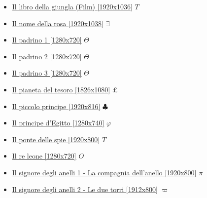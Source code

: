 \begin{itemize}
			\item \href{https://mega.nz/#!RuQB3CpS!5kZ5MSoNps3QmKyJsEtzw25B689mNXPvtUY9MZMNHm8} {Il libro della giungla (Film) [1920x1036]}  $T$ \\ 
			\item \href{https://mega.nz/#!3uo31ADa!0y20l86kdByWKWgxiPvcmo_guPjbonrHq1_gcAfVhRU} {Il nome della rosa [1920x1038]}  $\exists$ \\ 
			\item \href{https://mega.nz/#!pTxAHLZL!-ZDUNL0ARq3fFgcplNjTQq-DqcQzXB6cDNlNs5_CTBI} {Il padrino 1 [1280x720]}  $\varTheta$ \\ 
			\item \href{https://mega.nz/#!wKh2mTSJ!s9XGnMxGqQJEPzmXdtUyudJTwIcn6Z7ObsArBbp_cIo} {Il padrino 2 [1280x720]}  $\varTheta$ \\ 
			\item \href{https://mega.nz/#!JHJGHahS!eXKg582FrnYXIRKzDwEI4YbO5LyMabTIWMwTrmOmXj8} {Il padrino 3 [1280x720]}  $\varTheta$ \\ 
			\item \href{https://mega.nz/#!Ki5zjYjD!UeanMa-b4Y_xc0rEBBdvSq8E0xAIbZ4FoF63f6Bmt8s} {Il pianeta del tesoro [1826x1080]}  $\pounds$ \\ 
			\item \href{https://mega.nz/#!njhUGDbK!TNE4g3WiCOitU9nhAMR3Eb_cT7RNsurPFWLSYiF79GQ} {Il piccolo principe [1920x816]}  $\clubsuit$ \\  
			\item \href{https://mega.nz/#!FDJSACQI!9iSR6UFDTNTuW7K6kRvzIOp-HxEBAnAtjxjPoc-M1Pk} {Il principe d'Egitto [1280x740]}  $\varphi$ \\  
			\item \href{https://mega.nz/#!FvBzFLiI!xc6rxwZbl9knc2yOMdA5J7zRbyU7ebrKpukBRm6ej18} {Il ponte delle spie [1920x800]}  $T$ \\ 
			\item \href{https://mega.nz/#!omwShQBA!GooSXNv3sVK3h-i7CI3tkMjaSiz_UYp65RnRjdimgu8} {Il re leone [1280x720]}  $O$ \\ 
			\item \href{https://mega.nz/#!sEZkkAwQ!X164j8vjyLJ-QJd-CFR2qu6VrG-Ge7fRNiN1-7McHsY} {Il signore degli anelli 1 - La compagnia dell'anello [1920x800]}  $\pi$ \\ 
			\item \href{https://mega.nz/#!CRl02KpC!6A2ny6Vz4zbVN9NvjfNk-xX6XLraRKPkGza3hsU7wOM} {Il signore degli anelli 2 - Le due torri [1912x800]}  $\varpi$ \\ 

\end{itemize}
